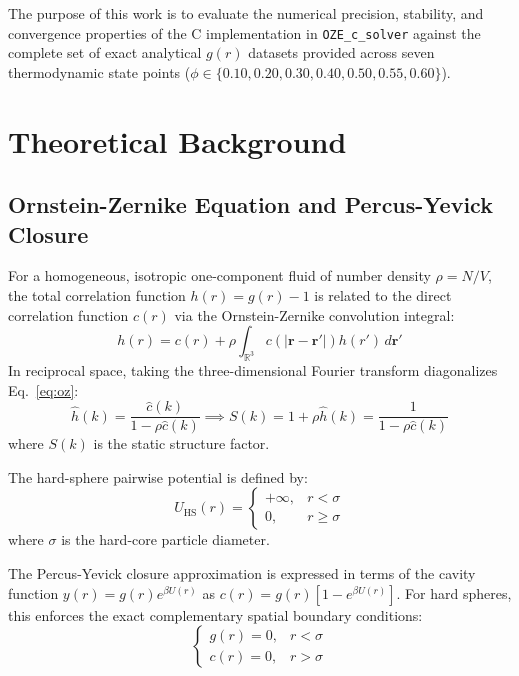 \documentclass[11pt,a4paper]{article}
\begin{document}
The purpose of this work is to evaluate the numerical precision, stability, and convergence properties of the C implementation in \texttt{OZE\_c\_solver} against the complete set of exact analytical $g(r)$ datasets provided across seven thermodynamic state points ($\phi \in \{0.10, 0.20, 0.30, 0.40, 0.50, 0.55, 0.60\}$).

\section{Theoretical Background}

\subsection{Ornstein-Zernike Equation and Percus-Yevick Closure}

For a homogeneous, isotropic one-component fluid of number density $\rho = N/V$, the total correlation function $h(r) = g(r) - 1$ is related to the direct correlation function $c(r)$ via the Ornstein-Zernike convolution integral:
\begin{equation}
h(r) = c(r) + \rho \int_{\mathbb{R}^3} c(|\mathbf{r} - \mathbf{r}'|) h(r') \, d\mathbf{r}'
\label{eq:oz}
\end{equation}
In reciprocal space, taking the three-dimensional Fourier transform diagonalizes Eq.~\eqref{eq:oz}:
\begin{equation}
\hat{h}(k) = \frac{\hat{c}(k)}{1 - \rho \hat{c}(k)} \implies S(k) = 1 + \rho \hat{h}(k) = \frac{1}{1 - \rho \hat{c}(k)}
\label{eq:sk}
\end{equation}
where $S(k)$ is the static structure factor.

The hard-sphere pairwise potential is defined by:
\begin{equation}
U_{\text{HS}}(r) = 
\begin{cases}
+\infty, & r < \sigma \\
0, & r \ge \sigma
\end{cases}
\end{equation}
where $\sigma$ is the hard-core particle diameter.

The Percus-Yevick closure approximation is expressed in terms of the cavity function $y(r) = g(r) e^{\beta U(r)}$ as $c(r) = g(r) [1 - e^{\beta U(r)}]$. For hard spheres, this enforces the exact complementary spatial boundary conditions:
\begin{equation}
\begin{cases}
g(r) = 0, & r < \sigma \\
c(r) = 0, & r > \sigma
\end{cases}
\label{eq:py_closure}
\end{equation}
\end{document}
